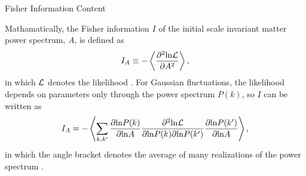 \begin{section}{Fisher Information Content}

  Mathamatically, the Fisher information $I$ of the initial scale
  invariant matter power spectrum, $A$, is defined as
  \begin{align}
    I_A \equiv -\left\langle \frac{\partial ^2 \mathrm{ln \mathcal{L}}}{\partial A ^2}\right\rangle,
    \label{eq:fisherdefine}
  \end{align}
  in which $\mathcal{L}$ denotes the likelihood \cite{bib:Tegmark1997}.  For Gaussian
  fluctuations, the likelihood depends on parameters only through the
  power spectrum $P(k)$, so $I$ can be written as 
  \begin{align}
    I_A = - \left\langle \sum_{k,k'} \frac{\partial \mathrm{ln} P(k)}{\partial \mathrm{ln} A} 
    \frac{\partial ^2 \mathrm{ln \mathcal{L}}}{\partial \mathrm{ln} P(k) \partial \mathrm{ln} P(k')}
    \frac{\partial \mathrm{ln} P(k')}{\partial \mathrm{ln} A}\right\rangle,
    \label{eq:fisherdef2}
  \end{align}
  in which the angle bracket denotes the average of many realizations
  of the power spectrum \cite{bib:Rimes2006}.


\end{section}

